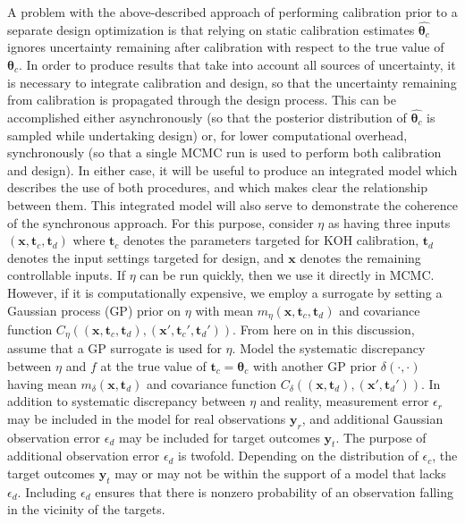 \documentclass[12pt]{article}
\begin{document}
%
A problem with the above-described approach of performing calibration prior to a separate design optimization is that relying on static calibration estimates $\widehat{\boldsymbol \theta_c}$ ignores uncertainty remaining after calibration with respect to the true value of $\boldsymbol\theta_c$.
%
In order to produce results that take into account all sources of uncertainty, it is necessary to integrate calibration and design, so that the uncertainty remaining from calibration is propagated through the design process.
%
This can be accomplished either asynchronously (so that the posterior distribution of $\widehat{\boldsymbol\theta_c}$ is sampled while undertaking design) or, for lower computational overhead, synchronously (so that a single MCMC run is used to perform both calibration and design).
%
In either case, it will be useful to produce an integrated model which describes the use of both procedures, and which makes clear the relationship between them.
%
This integrated model will also serve to demonstrate the coherence of the synchronous approach.
%
For this purpose, consider $\eta$ as having three inputs $(\mathbf x,\mathbf t_c,\mathbf t_d)$ where $\mathbf t_c$ denotes the parameters targeted for KOH calibration, $\mathbf t_d$ denotes the input settings targeted for design, and $\mathbf x$ denotes the remaining controllable inputs.
%
If $\eta$ can be run quickly, then we use it directly in MCMC.
%
However, if it is computationally expensive, we employ a surrogate by setting a Gaussian process (GP) prior on $\eta$ with mean $m_\eta(\mathbf x,\mathbf t_c,\mathbf t_d)$ and covariance function $C_\eta((\mathbf x,\mathbf t_c,\mathbf t_d),(\mathbf x',\mathbf t_c',\mathbf t_d'))$.
%
From here on in this discussion, assume that a GP surrogate is used for $\eta$.
%
Model the systematic discrepancy between $\eta$ and $f$ at the true value of $\mathbf t_c=\boldsymbol\theta_c$ with another GP prior $\delta(\cdot,\cdot)$ having mean $m_\delta(\mathbf x,\mathbf t_d)$ and covariance function $C_\delta((\mathbf x,\mathbf t_d),(\mathbf x',\mathbf t_d'))$.
%
In addition to systematic discrepancy between $\eta$ and reality, measurement error $\epsilon_r$ may be included in the model for real observations $\mathbf y_r$, and additional Gaussian observation error $\epsilon_d$ may be included for target outcomes $\mathbf y_t$.
%
The purpose of additional observation error $\epsilon_d$ is twofold.
%
Depending on the distribution of $\epsilon_c$, the target outcomes $\mathbf y_t$ may or may not be within the support of a model that lacks $\epsilon_d$.
%
Including $\epsilon_d$ ensures that there is nonzero probability of an observation falling in the vicinity of the targets.
\end{document}
